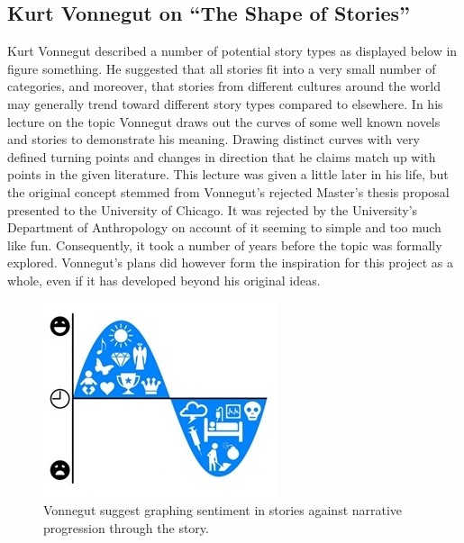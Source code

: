 \documentclass{article}
\begin{document}
    \subsection{Kurt Vonnegut on ``The Shape of Stories''}
        Kurt Vonnegut described a number of potential story types as displayed below in figure something. He suggested that all stories fit into a very small number of categories, and moreover, that stories from different cultures around the world may generally trend toward different story types compared to elsewhere. In his lecture on the topic \citep{vonnegutLecture} Vonnegut draws out the curves of some well known novels and stories to demonstrate his meaning. Drawing distinct curves with very defined turning points and changes in direction that he claims match up with points in the given literature. This lecture was given a little later in his life, but the original concept stemmed from Vonnegut's rejected Master's thesis proposal presented to the University of Chicago. It was rejected by the University's Department of Anthropology on account of it seeming to simple and too much like fun. Consequently, it took a number of years before the topic was formally explored. Vonnegut's plans did however form the inspiration for this project as a whole, even if it has developed beyond his original ideas.
        \begin{figure}[htbp]
            \centering
            \includegraphics{Figures/Misc/sentimentGraph}
            \caption{Vonnegut suggest graphing sentiment in stories against narrative progression through the story.}
            \label{fig:sentiGraph}
        \end{figure}
\end{document}
